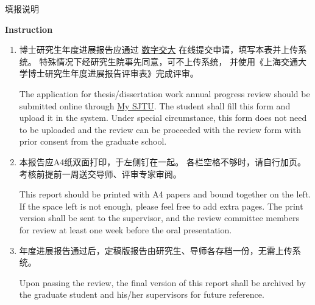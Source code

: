 \documentclass[a4paper,zihao=-4,AutoFakeBold]{ctexart}
\begin{document}
\clearpage

\pagestyle{fancy}
\cfoot{}
\fancyfootoffset{0pt}

\begin{center}
    {\heiti 填\quad 报\quad 说\quad 明}\par
    \vspace{5pt}
    {\bfseries Instruction}
\end{center}

\begin{enumerate}[parsep=.5\baselineskip]
    \fangsong
    \item 博士研究生年度进展报告应通过%
          \href{http://my.sjtu.edu.cn/}{\color{blue}\underline{数字交大}}%
          在线提交申请，填写本表并上传系统。
          特殊情况下经研究生院事先同意，可不上传系统，
          并使用《上海交通大学博士研究生年度进展报告评审表》完成评审。

          The application for thesis/dissertation work annual progress review should be submitted online through
          \href{http://my.sjtu.edu.cn/}{\color{blue}\underline{My SJTU}}.
          The student shall fill this form and upload it in the system.
          Under special circumstance, this form does not need to be
          uploaded and the review can be proceeded with the review
          form with prior consent from the graduate school.

    \item 本报告应A4纸双面打印，于左侧钉在一起。
          各栏空格不够时，请自行加页。考核前提前一周送交导师、评审专家审阅。

          This report should be printed with A4 papers and bound
          together on the left. If the space left is not enough,
          please feel free to add extra pages.
          The print version shall be sent to the supervisor,
          and the review committee members for review at least
          one week before the oral presentation.

    \item 年度进展报告通过后，定稿版报告由研究生、导师各存档一份，无需上传系统。
    
          Upon passing the review, 
          the final version of this report shall be archived by 
          the graduate student and his/her supervisors for 
          future reference.
\end{enumerate}
\end{document}
